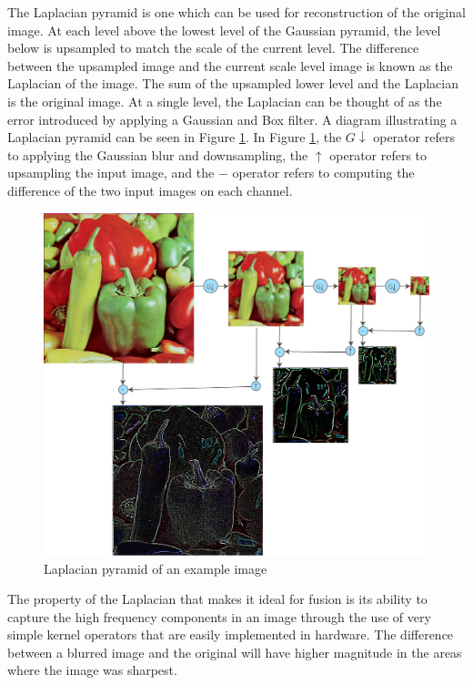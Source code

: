 \documentclass{article}
\begin{document}
The Laplacian pyramid is one which can be used for reconstruction of the original image. At each level above the lowest level of the Gaussian pyramid, the level below is upsampled to match the scale of the current level. The difference between the upsampled image and the current scale level image is known as the Laplacian of the image. The sum of the upsampled lower level and the Laplacian is the original image. At a single level, the Laplacian can be thought of as the error introduced by applying a Gaussian and Box filter. A diagram illustrating a Laplacian pyramid can be seen in Figure \ref{fig_pepper_laplacian_pyramid}. In Figure \ref{fig_pepper_laplacian_pyramid}, the $G\downarrow$ operator refers to applying the Gaussian blur and downsampling, the $\uparrow$ operator refers to upsampling the input image, and the $-$ operator refers to computing the difference of the two input 
images on each channel.
\begin{figure}[h]
	\centering
	\includegraphics[width=\textwidth]{figures/peppers/laplacian_pyramid}
	\caption{Laplacian pyramid of an example image}
	\label{fig_pepper_laplacian_pyramid}
\end{figure}

The property of the Laplacian that makes it ideal for fusion is its ability to capture the high frequency components in an image through the use of very simple kernel operators that are easily implemented in hardware. The difference between a blurred image and the original will have higher magnitude in the areas where the image was sharpest.
\end{document}
